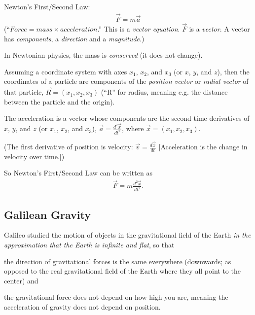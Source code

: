 \documentclass[pagesize,headsepline,10pt,parskip=half,BCOR=12mm]{scrreprt}
\newcommand{\eg}{\mbox{e.g.}\xspace}
\begin{document}
      Newton's First/Second Law:
      \begin{align}\label{eq:newton}
        \vec F = m\vec a
      \end{align}
      (``$Force = mass \times acceleration$.''
      This is a \emph{vector equation}.  $\vec F$ is a
      \emph{vector}. A vector has \emph{components}, a
      \emph{direction} and a \emph{magnitude}.)

      In Newtonian physics, the mass is \emph{conserved} (it does
      not change).

      Assuming a coordinate system with axes $x_1$, $x_2$, and
      $x_3$ (or $x$, $y$, and $z$), then the coordinates of a
      particle are components of the \emph{position vector} or
      \emph{radial vector} of that particle, $\vec R = (x_1, x_2,
      x_3)$ (``R'' for radius, meaning \eg the distance between the
      particle and the origin).

      The acceleration is a vector whose components are the
      second time derivatives of $x$, $y$, and $z$ (or $x_1$,
      $x_2$, and $x_3$), $\vec a = \frac{d^2\vec x}{dt^2}$, where
      $\vec x = (x_1, x_2, x_3)$.

      (The first derivative of position is velocity: $\vec v =
      \frac{d\vec x}{dt}$ [Acceleration is the change in velocity
      over time.])

      So Newton's First/Second Law can be written as
      \begin{align}\label{eq:newton-diff}
        \vec F = m\frac{d^2\vec x}{dt^2}.
      \end{align}

      \subsection{Galilean Gravity}

        Galileo studied the motion of objects in the gravitational
        field of the Earth \emph{in the approximation that the Earth
        is infinite and flat}, so that

        \begin{compactitem}
          \item the direction of gravitational forces is the same
          everywhere (downwards; as opposed to the real
          gravitational field of the Earth where they all point to
          the center) and
          \item the gravitational force does not depend on how high
          you are, meaning the acceleration of gravity does not
          depend on position.
        \end{compactitem}
\end{document}
